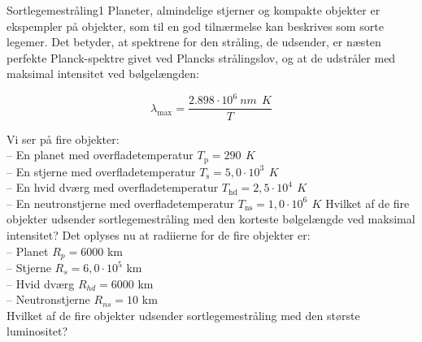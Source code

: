 \begin{opgave}{Sortlegemestråling}{1}
  Planeter, almindelige stjerner og kompakte objekter er ekspempler på
  objekter, som til en god tilnærmelse kan beskrives som sorte
  legemer. Det betyder, at spektrene for den stråling, de udsender, er
  næsten perfekte Planck-spektre givet ved Plancks strålingslov, og at
  de udstråler med maksimal intensitet ved bølgelængden:

\begin{equation}
\lambda_\text{max} = \frac{2.898 \cdot 10^{6} \SI{}{nm}~\SI{}{K}}{T}
\label{eq:wien}
\end{equation}

Vi ser på fire objekter:\\
 -- En planet med overfladetemperatur $T_\text{p} = 290\, \SI{}{K}$\\
 -- En stjerne med overfladetemperatur $T_\text{s} = 5,0\cdot 10^3\, \SI{}{K}$\\
 -- En hvid dværg med overfladetemperatur $T_\text{hd} = 2,5\cdot 10^4\, \SI{}{K}$\\
 -- En neutronstjerne med overfladetemperatur $T_\text{ns} = 1,0\cdot 10^6\, \SI{}{K}$
\opg Hvilket af de fire objekter udsender sortlegemestråling med den korteste bølgelængde ved maksimal intensitet?
\opg Det oplyses nu at radiierne for de fire objekter er: \\
 -- Planet $R_p = 6000$ km\\
 -- Stjerne $R_s = 6,0\cdot 10^5$ km\\
 -- Hvid dværg $R_{hd} = 6000$ km\\
 -- Neutronstjerne $R_{ns} = 10$ km\\

Hvilket af de fire objekter udsender sortlegemestråling med den største luminositet? 
\end{opgave}

